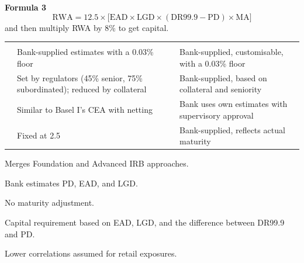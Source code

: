 \begin{orkeybox}
{\sffamily\bfseries\fontsize{8.6}{10}\selectfont\color{navy}Formula 3}
\[
\mathrm{RWA}=12.5\times\bigl[\mathrm{EAD}\times \mathrm{LGD}\times(\mathrm{DR}99.9-\mathrm{PD})\times \mathrm{MA}\bigr]
\]
\vspace{-4pt}
{\fontsize{9}{11}\selectfont\color{rust} and then multiply RWA by 8\% to get
capital.}
\end{orkeybox}


\noindent\begin{minipage}{\textwidth}
\renewcommand{\arraystretch}{1.32}
\begin{tabularx}{\textwidth}{@{}L{0.13\textwidth}YY@{}}
 \thd{} &  & \\
{\tabfont {}} & {\tabfont Bank-supplied estimates with a 0.03\% floor} & {\tabfont Bank-supplied, customisable, with a 0.03\% floor}\\
{\tabfont {}} & {\tabfont Set by regulators (45\% senior, 75\% subordinated); reduced by collateral} & {\tabfont Bank-supplied, based on collateral and seniority}\\
{\tabfont {}} & {\tabfont Similar to Basel I's CEA with netting} & {\tabfont Bank uses own estimates with supervisory approval}\\
{\tabfont {}} & {\tabfont Fixed at 2.5} & {\tabfont Bank-supplied, reflects actual maturity}\\
\end{tabularx}
\end{minipage}


\begin{lettered}
\item Merges Foundation and Advanced IRB approaches.
\item Bank estimates PD, EAD, and LGD.
\item No maturity adjustment.
\item Capital requirement based on EAD, LGD, and the difference between DR99.9 and
PD.
\item Lower correlations assumed for retail exposures.
\end{lettered}


